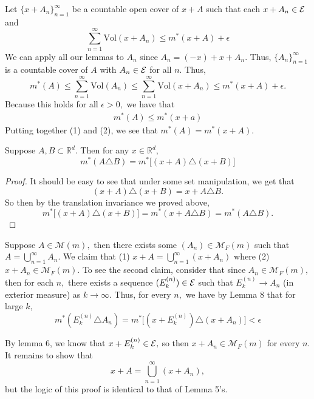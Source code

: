 \documentclass[11pt]{article}
\newcommand{\Vol}{\text{Vol}}
\newcommand{\bbR}{\mathbb{R}}
\begin{document}
\begin{solution}
Let $\{x + A_n\}_{n=1}^\infty$ be a countable open cover of $x + A$ such that each $x + A_n \in \cal E$ and 
\[\sum_{n=1}^\infty \Vol(x + A_n) \leq m^*(x + A) + \epsilon\]
We can apply all our lemmas to $A_n$ since $A_n = (-x) + x + A_n.$ Thus, $\{A_n\}_{n=1}^\infty$ is a countable cover of $A$ with $A_n \in \cal E$ for all $n.$  Thus, 
\[m^*(A) \leq \sum_{n=1}^\infty \Vol(A_n) \leq \sum_{n=1}^\infty \Vol(x + A_n) \leq m^*(x + A) + \epsilon.\] Because this holds for all $\epsilon>0,$ we have that 
\begin{align}
    m^*(A) \leq m^*(x + a)
\end{align}
Putting together (1) and (2), we see that $m^*(A) = m^*(x + A).$

\begin{lemma}
    Suppose $A, B \subset \bbR^d.$ Then for any $x\in \bbR^d,$ 
    \[m^*(A \triangle B) = m^*\big[(x + A)\triangle (x + B)\big]\]
\end{lemma}
\begin{proof}
    It should be easy to see that under some set manipulation, we get that 
    \[(x + A)\triangle (x + B) = x + A\triangle B.\] So then by the translation invariance we proved above, 
    \[m^*\big[(x + A)\triangle (x + B)\big] = m^*(x + A\triangle B) = m^*(A\triangle B).\]
\end{proof}

Suppose $A \in \mathcal{M}(m),$ then there exists some $(A_n)\in \mathcal{M}_F(m)$ such that $A = \bigcup_{n=1}^\infty A_n$. We claim that (1) $x + A = \bigcup_{n=1}^\infty (x + A_n)$ where (2) $x + A_n \in \mathcal{M}_F(m).$ To see the second claim, consider that since $A_n \in \mathcal{M}_F(m),$ then for each $n,$ there exists a sequence $(E^{(n)}_k) \in \cal E$ such that $E^{(n)}_k \to A_n$ (in exterior measure) as $k\to \infty.$ Thus, for every $n,$ we have by Lemma 8 that for large $k,$ 
\[m^*(E^{(n)}_k \triangle A_n) = m^*\big[(x + E^{(n)}_k) \triangle (x + A_n)\big] < \epsilon\]

By lemma 6, we know that $x + E_k^{(n)} \in \cal E,$ so then $x + A_n \in \mathcal{M}_F(m)$ for every $n.$ It remains to show that 
\[x + A = \bigcup_{n=1}^\infty (x + A_n),\] but the logic of this proof is identical to that of Lemma 5's.
\end{solution}

\newpage
\end{document}
